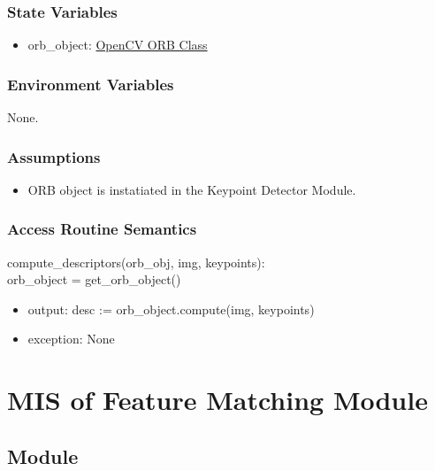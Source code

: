 \documentclass[12pt, titlepage]{article}
\begin{document}
\subsubsection{State Variables}
\begin{itemize}
\item orb\_object: \href{https://docs.opencv.org/3.4/db/d95/classcv_1_1ORB.html}{OpenCV ORB Class}
\end{itemize}


\subsubsection{Environment Variables}
None.

\subsubsection{Assumptions}
\begin{itemize}
\item ORB object is instatiated in the Keypoint Detector Module.
\end{itemize}


\subsubsection{Access Routine Semantics}

\noindent compute\_descriptors(orb\_obj, img, keypoints):\\
orb\_object = get\_orb\_object()
\begin{itemize}
\item output: desc := orb\_object.compute(img, keypoints)
\item exception: None 
\end{itemize}




\section{MIS of Feature Matching Module} \label{mFM}



\subsection{Module}
\end{document}
